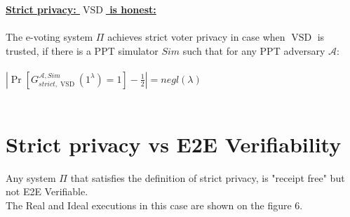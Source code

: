 \documentclass[12pt]{article}
\DeclareMathOperator{\vsd}{VSD}
\begin{document}
\underline{\textbf{Strict privacy: $\vsd$ is honest:}}\\\\
The e-voting system $\Pi$ achieves strict voter privacy in case when $\vsd$ is trusted, if there is a PPT simulator $Sim$ such that for any PPT adversary $\mathcal{A}$:\\\\
 $|\Pr[G_{strict,\vsd}^{\mathcal{A},Sim}(1^{\lambda}) = 1] - \frac{1}{2}| = negl(\lambda)$\\\\
%
\section{Strict privacy vs E2E Verifiability}
Any system $\Pi$ that satisfies the definition of strict privacy, is "receipt free" but not E2E Verifiable.\\
The Real and Ideal executions in this case are shown on the figure 6.
\end{document}
